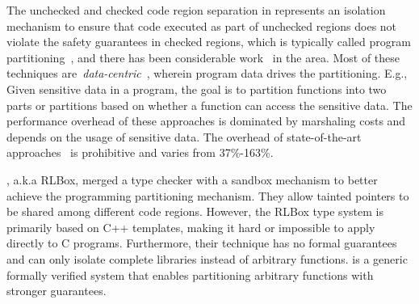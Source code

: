 %
The unchecked and checked code region separation in \systemname represents an isolation mechanism to ensure that code executed as part of unchecked regions does not violate the safety guarantees in checked regions,
which is typically called program partitioning~\cite{rul2009towards}, and there has been considerable work~\cite{tan2017principles, brumley2004privtrans, bittau2008wedge, lind2017glamdring, liu2017ptrsplit} in the area. Most of these techniques are~\emph{data-centric}~\cite{lind2017glamdring, liu2017ptrsplit}, wherein program data drives the partitioning. E.g., Given sensitive data in a program, the goal is to partition functions into two parts or partitions based on whether a function can access the sensitive data.
The performance overhead of these approaches is dominated by marshaling costs and depends on the usage of sensitive data.
The overhead of state-of-the-art approaches~\cite{lind2017glamdring, liu2017ptrsplit} is prohibitive and varies from 37\%-163\%.

\citet{rlbox-paper}, a.k.a RLBox, merged a type checker with a sandbox mechanism to better achieve the programming partitioning mechanism.
They allow tainted pointers to be shared among different code regions. 
However, the RLBox type system is primarily based on C++ templates, making it hard or impossible to apply directly to C programs.
Furthermore, their technique has no formal guarantees and can only isolate complete libraries instead of arbitrary functions.
\systemname is a generic formally verified system that enables partitioning arbitrary functions with stronger guarantees.

%

